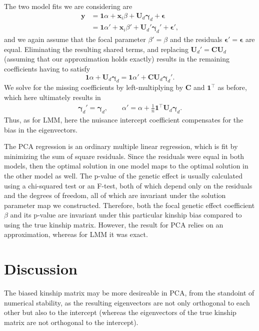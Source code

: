 \documentclass[11pt]{article}
\begin{document}
The two model fits we are considering are
\begin{align*}
  \mathbf{y}
  &=
    \mathbf{1} \alpha + \mathbf{x}_i \beta + \mathbf{U}_d \mathbf{\gamma}_d + \mathbf{\epsilon}
  \\
  &=
    \mathbf{1} \alpha' + \mathbf{x}_i \beta' + \mathbf{U}_d' \mathbf{\gamma}_d' + \mathbf{\epsilon}'
    ,
\end{align*}
and we again assume that the focal parameter $\beta' = \beta$ and the residuals $\mathbf{\epsilon}' = \mathbf{\epsilon}$ are equal.
Eliminating the resulting shared terms, and replacing $\mathbf{U}_d' = \mathbf{C} \mathbf{U}_d$ (assuming that our approximation holds exactly) results in the remaining coefficients having to satisfy
$$
\mathbf{1} \alpha + \mathbf{U}_d \mathbf{\gamma}_d
=
\mathbf{1} \alpha' + \mathbf{C} \mathbf{U}_d \mathbf{\gamma}_d'.
$$
We solve for the missing coefficients by left-multiplying by $\mathbf{C}$ and $\mathbf{1}^\intercal$ as before, which here ultimately results in
\begin{align*}
  \mathbf{\gamma}_d'
  =
    \mathbf{\gamma}_d
  ,
  \quad\quad
  \alpha'
  =
    \alpha + \frac{1}{n} \mathbf{1}^\intercal \mathbf{U}_d \mathbf{\gamma}_d
    .
\end{align*}
Thus, as for LMM, here the nuisance intercept coefficient compensates for the bias in the eigenvectors.

The PCA regression is an ordinary multiple linear regression, which is fit by minimizing the sum of square residuals.
Since the residuals were equal in both models, then the optimal solution in one model maps to the optimal solution in the other model as well.
The p-value of the genetic effect is usually calculated using a chi-squared test or an F-test, both of which depend only on the residuals and the degrees of freedom, all of which are invariant under the solution parameter map we constructed.
Therefore, both the focal genetic effect coefficient $\beta$ and its p-value are invariant under this particular kinship bias compared to using the true kinship matrix.
However, the result for PCA relies on an approximation, whereas for LMM it was exact.

\section{Discussion}

The biased kinship matrix may be more desireable in PCA, from the standoint of numerical stability, as the resulting eigenvectors are not only orthogonal to each other but also to the intercept (whereas the eigenvectors of the true kinship matrix are not orthogonal to the intercept).
\end{document}
